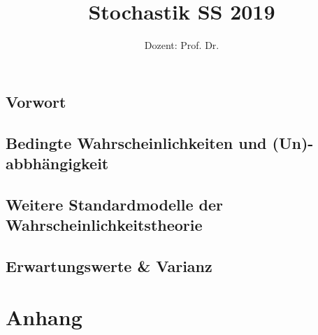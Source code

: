 \documentclass[ngerman,a4paper,order=firstname]{local_mathscript} %
\title{\textbf{Stochastik SS 2019}}
\author{Dozent: Prof. Dr. \person{Anita Behme}}
\begin{document}
\pagestyle{plain}

\maketitle

\hypertarget{tocpage}{}
\tableofcontents
{}

\pagebreak
{}
\pagestyle{fancy}

\chapter*{Vorwort}





\chapter[Bedingte Wkeiten und (Un-)abbhängigkeit]{Bedingte Wahrscheinlichkeiten und (Un)-abbhängigkeit}


\chapter{Weitere Standardmodelle der Wahrscheinlichkeitstheorie}


\chapter{Erwartungswerte \& Varianz}




\part*{Anhang}
\appendix

\nocite{*}




\printindex
\end{document}
